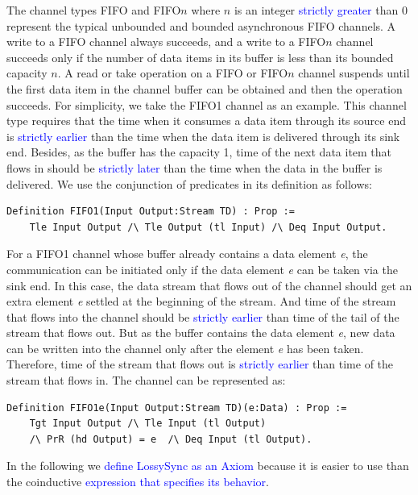 \documentclass[preprint,3p]{elsarticle}
\newcommand{\liyi}[1]{\textcolor{blue}{#1}}
\newcommand{\xy}[1]{{#1}}
\begin{document}
The channel types FIFO and FIFO$n$ where $n$ is an integer \liyi{strictly greater} than $0$ represent the
typical unbounded and bounded asynchronous FIFO channels. A write to a FIFO channel always succeeds, and a write to a FIFO$n$ channel succeeds only if the
number of data items in its buffer is less than its bounded capacity $n$. A read or take operation on a FIFO or FIFO$n$ channel suspends until the first data item
in the channel buffer can be obtained and then the operation succeeds.
For simplicity, we take the FIFO1 channel as an example. This channel type requires that the time when it consumes a data item through its source end is \liyi{strictly earlier} than the time when the data item is delivered through its sink end. Besides, as the buffer has the capacity 1, time of the next data item that flows in should be \liyi{strictly later} than the time when the data in the buffer is delivered. We use \xy{the conjunction of predicates} in its definition as follows:
\begin{lstlisting}[language=coq]
Definition FIFO1(Input Output:Stream TD) : Prop :=
    Tle Input Output /\ Tle Output (tl Input) /\ Deq Input Output.
\end{lstlisting}

For a FIFO1 channel whose buffer already contains a data element \emph{e}, the communication can be initiated only if the data element \emph{e} can be taken via the sink end. In this case, the data stream that flows out of the channel should get an extra element \emph{e} settled at the beginning of the stream. And time of the stream that flows into the channel should be \liyi{strictly earlier} than time of the tail of the stream that flows out. But as the buffer contains the data element \emph{e}, new data can be written into the channel only after the element \emph{e} has been taken. Therefore, time of the stream that flows out is \liyi{strictly earlier} than time of the stream that flows in. The channel can be represented as:
\begin{lstlisting}[language=coq]
Definition FIFO1e(Input Output:Stream TD)(e:Data) : Prop :=
    Tgt Input Output /\ Tle Input (tl Output)
    /\ PrR (hd Output) = e  /\ Deq Input (tl Output).
\end{lstlisting}

In the following we \liyi{define LossySync as an Axiom}
because it is easier to use than the coinductive \liyi{expression that specifies its behavior}.
\end{document}

